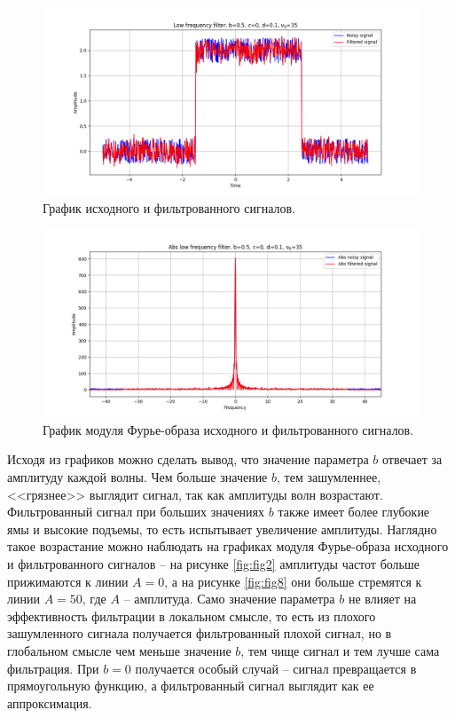 \documentclass[a4paper, 12pt]{article}
\begin{document}
    \begin{figure}[!htb]
        \centering
        \includegraphics[scale=0.485]{9_u_flt_u_nohigh.png}
        \captionsetup{skip=0pt}
        \caption{График исходного и фильтрованного сигналов.}
        \label{fig:fig25}
    \end{figure}
    \begin{figure}[!htb]
        \centering
        \includegraphics[scale=0.485]{9_abs_u_U_nohigh.png}
        \captionsetup{skip=0pt}
        \caption{График модуля Фурье-образа исходного и фильтрованного сигналов.}
        \label{fig:fig26}
    \end{figure}


    Исходя из графиков можно сделать вывод, что значение параметра $b$ отвечает за амплитуду каждой волны.
    Чем больше значение $b$, тем зашумленнее, <<грязнее>> выглядит сигнал, так как амплитуды волн возрастают.
    Фильтрованный сигнал при больших значениях $b$ также имеет более глубокие ямы и высокие подъемы, то есть
    испытывает увеличение амплитуды. Наглядно такое возрастание можно наблюдать на графиках модуля Фурье-образа
    исходного и фильтрованного сигналов -- на рисунке \ref{fig:fig2} амплитуды частот больше прижимаются к линии 
    $A=0$, а на рисунке \ref{fig:fig8} они больше стремятся к линии $A=50$, где $A$ -- амплитуда. Само значение
    параметра $b$ не влияет на эффективность фильтрации в локальном смысле, то есть из плохого зашумленного сигнала
    получается фильтрованный плохой сигнал, но в глобальном смысле чем меньше значение $b$, тем чище сигнал и тем лучше
    сама фильтрация. При $b=0$ получается особый случай -- сигнал превращается в прямоугольную функцию, а фильтрованный
    сигнал выглядит как ее аппроксимация.
\end{document}
